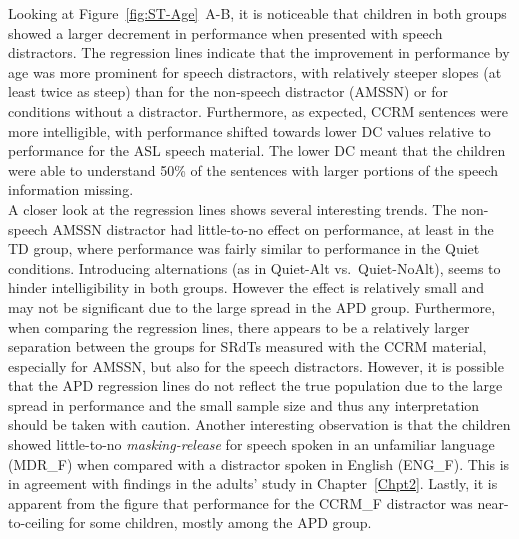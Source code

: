 \documentclass[a4paper, twoside]{templates/ociamthesis}
\begin{document}
Looking at Figure~\ref{fig:ST-Age}~A-B, it is noticeable that children in both groups showed a larger decrement in performance when presented with speech distractors. The regression lines indicate that the improvement in performance by age was more prominent for speech distractors, with relatively steeper slopes (at least twice as steep) than for the non-speech distractor (AMSSN) or for conditions without a distractor. Furthermore, as expected, CCRM sentences were more intelligible, with performance shifted towards lower DC values relative to performance for the ASL speech material. The lower DC meant that the children were able to understand 50\% of the sentences with larger portions of the speech information missing.\\

A closer look at the regression lines shows several interesting trends. The non-speech AMSSN distractor had little-to-no effect on performance, at least in the TD group, where performance was fairly similar to performance in the Quiet conditions. Introducing alternations (as in Quiet-Alt vs.~Quiet-NoAlt), seems to hinder intelligibility in both groups. However the effect is relatively small and may not be significant due to the large spread in the APD group. Furthermore, when comparing the regression lines, there appears to be a relatively larger separation between the groups for SRdTs measured with the CCRM material, especially for AMSSN, but also for the speech distractors. However, it is possible that the APD regression lines do not reflect the true population due to the large spread in performance and the small sample size and thus any interpretation should be taken with caution. Another interesting observation is that the children showed little-to-no \emph{masking-release} for speech spoken in an unfamiliar language (MDR\_F) when compared with a distractor spoken in English (ENG\_F). This is in agreement with findings in the adults' study in Chapter~\ref{Chpt2}. Lastly, it is apparent from the figure that performance for the CCRM\_F distractor was near-to-ceiling for some children, mostly among the APD group.\\
\end{document}
